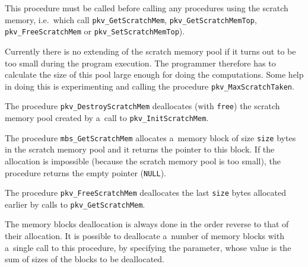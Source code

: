 This procedure must be called before calling any procedures using
the scratch memory, i.e.\ which call
\texttt{pkv\_GetScratchMem}, \texttt{pkv\_GetScratchMemTop}, \\
\texttt{pkv\_FreeScratchMem} or \texttt{pkv\_SetScratchMemTop}).

Currently there is no extending of the scratch memory pool if it
turns out to be too small during the program execution.
The programmer therefore has to calculate the size of this pool
large enough for doing the computations.
Some help in doing this is experimenting and calling the procedure
\texttt{pkv\_MaxScratchTaken}.

\vspace{\bigskipamount}
The procedure \texttt{pkv\_DestroyScratchMem} deallocates (with
\texttt{free}) the scratch memory pool created by a~call to
\texttt{pkv\_InitScratchMem}.

\vspace{\bigskipamount}
\begin{sloppypar}
The procedure \texttt{mbs\_GetScratchMem} allocates a~memory block of size
\texttt{size} bytes in the scratch memory pool and it returns the
pointer to this block. If the allocation is impossible (because the scratch
memory pool is too small), the procedure returns the empty pointer
(\texttt{NULL}).
\end{sloppypar}

\vspace{\bigskipamount}
The procedure \texttt{pkv\_FreeScratchMem} deallocates the last \texttt{size}
bytes allocated earlier by calls to \texttt{pkv\_GetScratchMem}.

The memory blocks deallocation is always done in the order reverse to
that of their allocation. It is possible to deallocate a~number of
memory blocks with a~single call to this procedure, by specifying the parameter,
whose value is the sum of sizes of the blocks to be deallocated.

